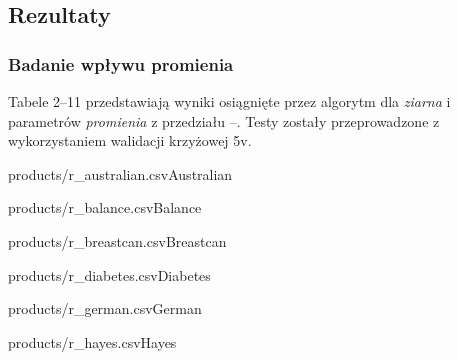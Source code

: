 \documentclass[]{article}
\begin{document}
\subsection{Rezultaty}

\subsubsection{Badanie wpływu promienia}

Tabele 2--11 przedstawiają wyniki osiągnięte przez algorytm dla \emph{ziarna}  i parametrów \emph{promienia} z przedziału --. Testy zostały przeprowadzone z wykorzystaniem walidacji krzyżowej \oldstylenums5v.

\begin{table}[htb]
    \parbox{.45\linewidth}{
	    \begin{ride}{products/r_australian.csv}{Australian}\end{ride}
	}
	\hfill
    \parbox{.45\linewidth}{
	    \begin{ride}{products/r_balance.csv}{Balance}\end{ride}
	}
\end{table}

\begin{table}[!ht]
    \parbox{.45\linewidth}{
	    \begin{ride}{products/r_breastcan.csv}{Breastcan}\end{ride}
	}
	\hfill
    \parbox{.45\linewidth}{
	    \begin{ride}{products/r_diabetes.csv}{Diabetes}\end{ride}
	}
\end{table}


\begin{table}[!ht]
    \parbox{.45\linewidth}{
	    \begin{ride}{products/r_german.csv}{German}\end{ride}
	}
	\hfill
    \parbox{.45\linewidth}{
	    \begin{ride}{products/r_hayes.csv}{Hayes}\end{ride}
	}
\end{table}
\end{document}
